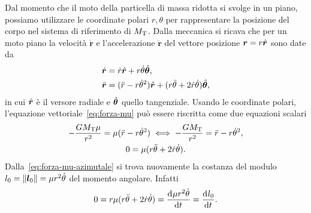 Dal momento che il moto della particella di massa ridotta si svolge in un piano,
possiamo utilizzare le coordinate polari $r,\theta$ per rappresentare la
posizione del corpo nel sistema di riferimento di $M_\textup{T}$. Dalla
meccanica si ricava che per un moto piano la velocità $\dot{\bm{r}}$ e
l'accelerazione $\ddot{\bm{r}}$ del vettore posizione $\bm{r}=r\hat{\bm{r}}$ sono
date da
\begin{subequations}
  \begin{align}
    \dot{\bm{r}}  &= \dot{r}\hat{\bm{r}} +
    r\dot{\theta}\hat{\bm{\theta}}, \label{eq:velocita-polare}\\
    \ddot{\bm{r}} &= (\ddot{r}-r\dot{\theta}^2)\hat{\bm{r}} + (r\ddot{\theta} +
    2\dot{r}\dot{\theta}) \hat{\bm{\theta}},
  \end{align}
\end{subequations}
in cui $\hat{\bm{r}}$ è il versore radiale e $\hat{\bm{\theta}}$ quello
tangenziale. Usando le coordinate polari, l'equazione
vettoriale~\eqref{eq:forza-mu} può essere riscritta come due equazioni scalari
\begin{subequations}
  \begin{gather}
    -\frac{GM_\textup{T}\mu}{r^2} = \mu(\ddot{r} - r\dot{\theta}^2) \iff
    -\frac{GM_\textup{T}}{r^2}=\ddot{r}-r\dot{\theta}^2,
    \label{eq:forza-mu-radiale}\\
    0 = \mu(r\ddot{\theta} +
    2\dot{r}\dot{\theta}). \label{eq:forza-mu-azimutale}
  \end{gather}
\end{subequations}
Dalla~\eqref{eq:forza-mu-azimutale} si trova nuovamente la costanza del modulo
$l_0 = \lVert\bm{l}_0\rVert = \mu r^2\dot{\theta}$ del momento angolare. Infatti
\begin{equation}
  0 = r\mu(r\ddot{\theta} + 2\dot{r}\dot{\theta}) = \frac{{\mathop{}\!\mathrm{d}^{}}\mu
    r^2\dot{\theta}}{\mathop{}\!\mathrm{d} {t}^{}} = \frac{{\mathop{}\!\mathrm{d}^{}}l_0}{\mathop{}\!\mathrm{d} {t}^{}}.
\end{equation}

